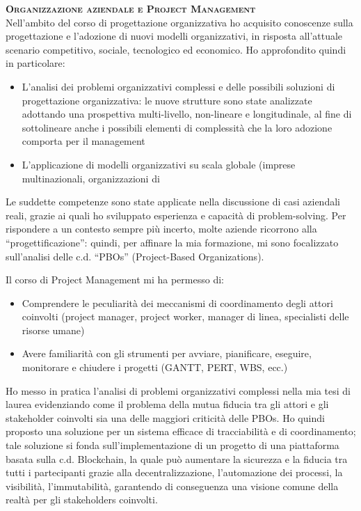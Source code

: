 \documentclass[11pt, a4paper]{article}
\begin{document}
\textbf{\textsc{Organizzazione aziendale e Project Management}} \\
Nell’ambito del corso di progettazione organizzativa ho acquisito conoscenze sulla progettazione e l’adozione di nuovi modelli organizzativi, in risposta all’attuale scenario competitivo, sociale, tecnologico ed economico. Ho approfondito quindi in particolare: 
\begin{itemize}
	\item L’analisi dei problemi organizzativi complessi e delle possibili soluzioni di progettazione organizzativa: le nuove strutture sono state analizzate adottando una prospettiva multi-livello, non-lineare e longitudinale, al fine di sottolineare anche i possibili elementi di complessità che la loro adozione comporta per il management
	\item L’applicazione di modelli organizzativi su scala globale (imprese multinazionali, organizzazioni di
\end{itemize}
Le suddette competenze sono state applicate nella discussione di casi aziendali reali, grazie ai quali ho sviluppato esperienza e capacità di problem-solving.
Per rispondere a un contesto sempre più incerto, molte aziende ricorrono alla “progettificazione”: quindi, per affinare la mia formazione, mi sono focalizzato sull’analisi delle c.d. “PBOs” (Project-Based Organizations).

Il corso di Project Management mi ha permesso di:
\begin{itemize}
	\item Comprendere le peculiarità dei meccanismi di coordinamento degli attori coinvolti (project manager, project worker, manager di linea, specialisti delle risorse umane)
	\item Avere familiarità con gli strumenti per avviare, pianificare, eseguire, monitorare e chiudere i progetti (GANTT, PERT, WBS, ecc.)
\end{itemize}
Ho messo in pratica l’analisi di problemi organizzativi complessi nella mia tesi di laurea evidenziando come il problema della mutua fiducia tra gli attori e gli stakeholder coinvolti sia una delle maggiori criticità delle PBOs. Ho quindi proposto una soluzione per un sistema efficace di tracciabilità e di coordinamento; tale soluzione si fonda sull’implementazione di un progetto di una piattaforma basata sulla c.d. Blockchain, la quale può aumentare la sicurezza e la fiducia tra tutti i partecipanti grazie alla decentralizzazione, l’automazione dei processi, la visibilità, l’immutabilità, garantendo di conseguenza una visione comune della realtà per gli stakeholders coinvolti.
\end{document}
